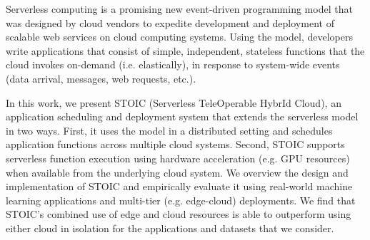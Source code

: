 Serverless computing is a promising new event-driven  programming model that was designed by cloud vendors 
to expedite development and deployment of scalable
web services on cloud computing systems. Using the model, developers write applications that consist of simple, independent, stateless functions that the cloud invokes on-demand (i.e. elastically), in response to system-wide events (data arrival, messages, web requests, etc.).

In this work, we present
STOIC (Serverless TeleOperable HybrId Cloud), an application scheduling and deployment system that 
extends the serverless model in two ways. First,
it uses the model in a distributed setting and schedules application functions across multiple cloud systems.
Second, STOIC supports serverless function execution using hardware acceleration (e.g. GPU resources) when available from the underlying cloud system. We overview the design and implementation of STOIC and empirically evaluate it using real-world machine learning applications and multi-tier (e.g. edge-cloud) deployments. We find that STOIC's combined use of edge and cloud resources is able to outperform using either cloud in isolation for the applications and datasets that we consider.


